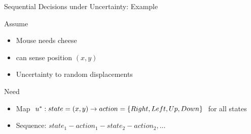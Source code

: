 \documentclass[10pt]{beamer}
\begin{document}
\begin{frame}[fragile]{Sequential Decisions under Uncertainty: Example}
\color{black}
\begin{block}{Assume}
\begin{itemize}
\item Mouse needs cheese
\item can sense position $(x,y)$
\item Uncertainty to random displacements
\end{itemize}
\end{block}
\begin{block}{Need}
\begin{itemize}
\item Map $u^*: state=(x,y)\rightarrow action=\{Right,Left,Up,Down\}$ for all states
\item Sequence: $state_1-action_1-state_2-action_2,\ldots$
\end{itemize}
\end{block}

\end{frame}
\end{document}
